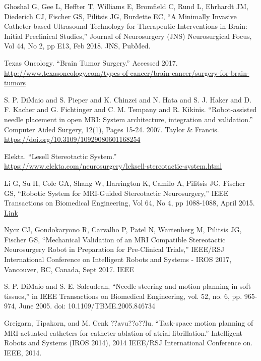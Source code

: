 \documentclass[12pt]{report}
\begin{document}
\begin{thebibliography}{99}
 Ghoshal G, Gee L, Heffter T, Williams E, Bromfield C, Rund L, Ehrhardt JM, Diederich CJ, Fischer GS, Pilitsis JG, Burdette EC, ``A Minimally Invasive Catheter-based Ultrasound Technology for Therapeutic Interventions in Brain: Initial Preclinical Studies,'' Journal of Neurosurgery (JNS) Neurosurgical Focus, Vol 44, No 2, pp E13, Feb 2018. JNS, PubMed.

 Texas Oncology. ``Brain Tumor Surgery.'' Accessed 2017. \url{http://www.texasoncology.com/types-of-cancer/brain-cancer/surgery-for-brain-tumors}

 S. P. DiMaio and S. Pieper and K. Chinzei and N. Hata and S. J. Haker and D. F. Kacher and G. Fichtinger and C. M. Tempany and R. Kikinis. ``Robot-assisted needle placement in open MRI: System architecture, integration and validation.'' Computer Aided Surgery, 12(1), Pages 15-24. 2007. Taylor \& Francis. \url{https://doi.org/10.3109/10929080601168254}

 Elekta. ``Lesell Stereotactic System.'' \url{https://www.elekta.com/neurosurgery/leksell-stereotactic-system.html}

 Li G, Su H, Cole GA, Shang W, Harrington K, Camilo A, Pilitsis JG, Fischer GS, ``Robotic System for MRI-Guided Stereotactic Neurosurgery,'' IEEE Transactions on Biomedical Engineering, Vol 64, No 4, pp 1088-1088, April 2015. \href{http://aimlab.wpi.edu/includes/publications/2014_TBME_Li_Fischer_RoboticSystemforMRIGuidedStereotacticNeurosurgery.pdf}{Link}

 Nycz CJ, Gondokaryono R, Carvalho P, Patel N, Wartenberg M, Pilitsis JG, Fischer GS, ``Mechanical Validation of an MRI Compatible Stereotactic Neurosurgery Robot in Preparation for Pre-Clinical Trials,'' IEEE/RSJ International Conference on Intelligent Robots and Systems - IROS 2017, Vancouver, BC, Canada, Sept 2017. IEEE

 S. P. DiMaio and S. E. Salcudean, ``Needle steering and motion planning in soft tissues,'' in IEEE Transactions on Biomedical Engineering, vol. 52, no. 6, pp. 965-974, June 2005. doi: 10.1109/TBME.2005.846734

 Greigarn, Tipakorn, and M. Cenk ??avu??o??lu. ``Task-space motion planning of MRI-actuated catheters for catheter ablation of atrial fibrillation.'' Intelligent Robots and Systems (IROS 2014), 2014 IEEE/RSJ International Conference on. IEEE, 2014.


\end{thebibliography}
\end{document}
